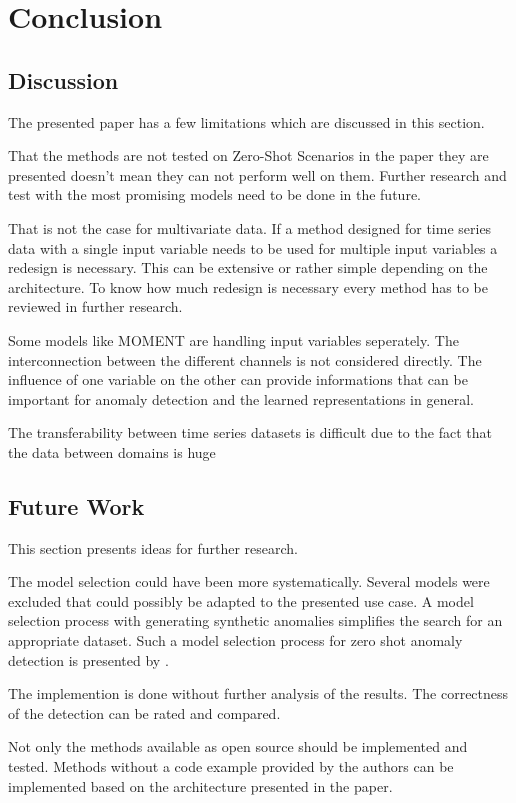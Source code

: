 \section{Conclusion}\label{conclusion}
\subsection{Discussion}
The presented paper has a few limitations which are discussed in this section.

That the methods are not tested on Zero-Shot Scenarios in the paper they are presented doesn't mean they can not perform well on them.  Further research and test with the most promising models need to be done in the future.

That is not the case for multivariate data. If a method designed for time series data with a single input variable needs to be used for multiple input variables a redesign is necessary. This can be extensive or rather simple depending on the architecture. To know how much redesign is necessary every method has to be reviewed in further research.

Some models like MOMENT are handling input variables seperately. The interconnection between the different channels is not considered directly. The influence of one variable on the other can provide informations that can be important for anomaly detection and the learned representations in general.


The transferability between time series datasets is difficult due to the fact that the data between domains is huge 

\subsection{Future Work}
This section presents ideas for further research.

The model selection could have been more systematically. Several models were excluded that could possibly be adapted to the presented use case. A model selection process with generating synthetic anomalies simplifies the search for an appropriate dataset. Such a model selection process for zero shot anomaly detection is presented by .

The implemention is done without further analysis of the results. The correctness of the detection can be rated and compared.

%
Not only the methods available as open source should be implemented and tested. Methods without a code example provided by the authors can be implemented based on the architecture presented in the paper.
